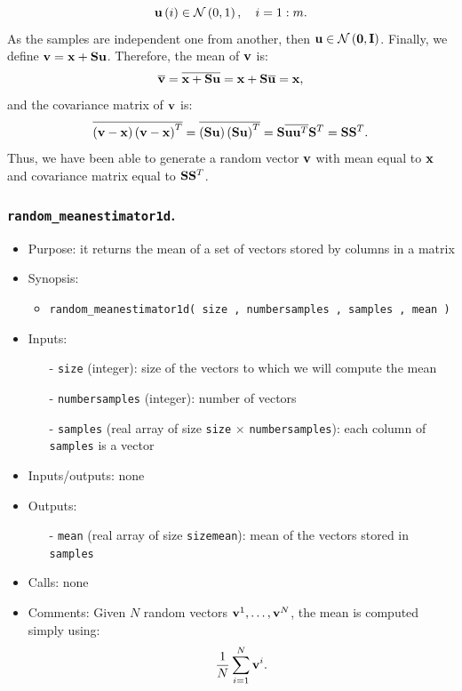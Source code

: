 \documentclass[12pt]{article}
\begin{document}
\begin{itemize}
\begin{equation}
{\bf u} \left( i \right) \in \mathcal{N} \left( 0 , 1 \right), \quad i=1 : m.
\end{equation}
As the samples are independent one from another, then ${\bf u} \in \mathcal{N} \left( {\bf 0} , {\bf I} \right)$. Finally, we define ${\bf v} = {\bf x} + {\bf S} {\bf u}$. Therefore, the mean of ${\bf v}$ is:
\begin{equation}
\overline{ {\bf v} } = \overline{ {\bf x} + {\bf S} {\bf u} } = {\bf x} + {\bf S} \overline{ {\bf u} } = {\bf x},
\end{equation}
and the covariance matrix of ${\bf v}$ is:
\begin{equation}
\overline{ \left( {\bf v} - {\bf x} \right) \left( {\bf v} - {\bf x} \right)^T } = \overline{ \left( {\bf S} {\bf u} \right) \left( {\bf S} {\bf u} \right)^T } = {\bf S} \overline{ {\bf u} {\bf u}^T } {\bf S}^T = {\bf S} {\bf S}^T.
\end{equation}
Thus, we have been able to generate a random vector ${\bf v}$ with mean equal to ${\bf x}$ and covariance matrix equal to ${\bf S} {\bf S}^T$.
\end{itemize} 

\subsubsection{{\tt random\_meanestimator1d}.}
\begin{itemize}
\item Purpose: it returns the mean of a set of vectors stored by columns in a matrix
\item Synopsis: 
\begin{itemize}
\item {\tt random\_meanestimator1d( size , numbersamples , samples , mean )}
\end{itemize}
\item Inputs: 
\begin{itemize}
\item[-] {\tt size} (integer): size of the vectors to which we will compute the mean
\item[-] {\tt numbersamples} (integer): number of vectors
\item[-] {\tt samples} (real array of size {\tt size} $\times$ {\tt numbersamples}): each column of {\tt samples} is a vector
\end{itemize}
\item Inputs/outputs: none
\item Outputs:
\begin{itemize}
\item[-] {\tt mean} (real array of size {\tt sizemean}): mean of the vectors stored in {\tt samples}
\end{itemize}
\item Calls: none
\item Comments: Given $N$ random vectors ${\bf v}^1, \ldots, {\bf v}^N$, the mean is computed simply using:
\begin{equation}
\frac{1}{N} \sum_{i=1}^N {\bf v}^i. 
\end{equation}
\end{itemize} 
\end{document}
